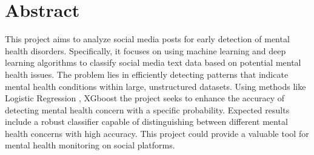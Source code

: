 

\section*{Abstract} 




\noindent
This project aims to analyze social media posts for early detection of mental health disorders. Specifically, it focuses on using machine learning and deep learning algorithms to classify social media text data based on potential mental health issues. The problem lies in efficiently detecting patterns that indicate mental health conditions within large, unstructured datasets. Using methods like Logistic Regression , XGboost the project seeks to enhance the accuracy of detecting mental health concern with a specific probability. Expected results include a robust classifier capable of distinguishing between different mental health concerns with high accuracy. This project could provide a valuable tool for mental health monitoring on social platforms.

